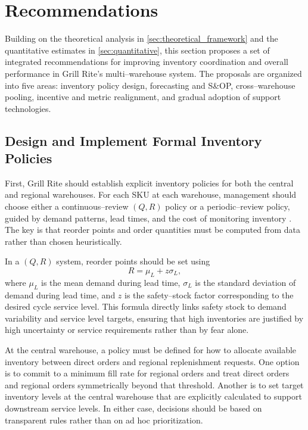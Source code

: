 \documentclass[12pt,a4paper]{article}
\begin{document}
\section{Recommendations}
\label{sec:recommendations}

Building on the theoretical analysis in \cref{sec:theoretical_framework} and the quantitative estimates in \cref{sec:quantitative}, this section proposes a set of integrated recommendations for improving inventory coordination and overall performance in Grill Rite's multi–warehouse system. The proposals are organized into five areas: inventory policy design, forecasting and S\&OP, cross–warehouse pooling, incentive and metric realignment, and gradual adoption of support technologies.

\subsection{Design and Implement Formal Inventory Policies}

First, Grill Rite should establish explicit inventory policies for both the central and regional warehouses. For each SKU at each warehouse, management should choose either a continuous–review $(Q, R)$ policy or a periodic–review policy, guided by demand patterns, lead times, and the cost of monitoring inventory \citep{stevenson2017operations}. The key is that reorder points and order quantities must be computed from data rather than chosen heuristically.

In a $(Q, R)$ system, reorder points should be set using
\[
R = \mu_L + z \sigma_L,
\]
where $\mu_L$ is the mean demand during lead time, $\sigma_L$ is the standard deviation of demand during lead time, and $z$ is the safety–stock factor corresponding to the desired cycle service level. This formula directly links safety stock to demand variability and service level targets, ensuring that high inventories are justified by high uncertainty or service requirements rather than by fear alone.

At the central warehouse, a policy must be defined for how to allocate available inventory between direct orders and regional replenishment requests. One option is to commit to a minimum fill rate for regional orders and treat direct orders and regional orders symmetrically beyond that threshold. Another is to set target inventory levels at the central warehouse that are explicitly calculated to support downstream service levels. In either case, decisions should be based on transparent rules rather than on ad hoc prioritization.
\end{document}
